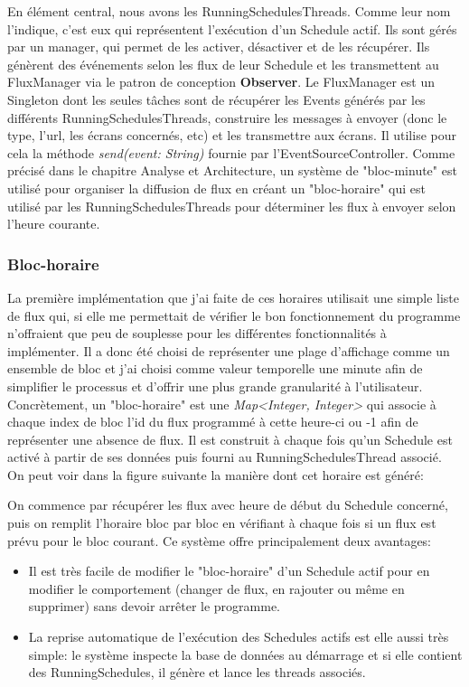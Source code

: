 \documentclass[french]{article}
\begin{document}
En élément central, nous avons les RunningSchedulesThreads. Comme leur nom l'indique, c'est eux qui représentent l'exécution d'un Schedule actif. Ils sont gérés par un manager, qui permet de les activer, désactiver et de les récupérer. Ils génèrent des événements selon les flux de leur Schedule et les transmettent au FluxManager via le patron de conception \textbf{Observer}. \newline
Le FluxManager est un Singleton dont les seules tâches sont de récupérer les Events générés par les différents RunningSchedulesThreads, construire les messages à envoyer (donc le type, l'url, les écrans concernés, etc) et les transmettre aux écrans. Il utilise pour cela la méthode \textit{send(event: String)} fournie par l'EventSourceController.\newline
Comme précisé dans le chapitre Analyse et Architecture, un système de "bloc-minute" est utilisé pour organiser la diffusion de flux en créant un "bloc-horaire" qui est utilisé par les RunningSchedulesThreads pour déterminer les flux à envoyer selon l'heure courante.

\subsubsection{Bloc-horaire}
La première implémentation que j'ai faite de ces horaires utilisait une simple liste de flux qui, si elle me permettait de vérifier le bon fonctionnement du programme n'offraient que peu de souplesse pour les différentes fonctionnalités à implémenter. Il a donc été choisi de représenter une plage d'affichage comme un ensemble de bloc et j'ai choisi comme valeur temporelle une minute afin de simplifier le processus et d'offrir une plus grande granularité à l'utilisateur.\newline
Concrètement, un "bloc-horaire" est une \textit{Map<Integer, Integer>} qui associe à chaque index de bloc l'id du flux programmé à cette heure-ci ou -1 afin de représenter une absence de flux. Il est construit à chaque fois qu'un Schedule est activé à partir de ses données puis fourni au RunningSchedulesThread associé. On peut voir dans la figure suivante la manière dont cet horaire est généré:



On commence par récupérer les flux avec heure de début du Schedule concerné, puis on remplit l'horaire bloc par bloc en vérifiant à chaque fois si un flux est prévu pour le bloc courant. \newline
Ce système offre principalement deux avantages: 
\begin{itemize}
	\item Il est très facile de modifier le "bloc-horaire" d'un Schedule actif pour en modifier le comportement (changer de flux, en rajouter ou même en supprimer) sans devoir arrêter le programme.
	\item La reprise automatique de l'exécution des Schedules actifs est elle aussi très simple: le système inspecte la base de données au démarrage et si elle contient des RunningSchedules, il génère et lance les threads associés.
\end{itemize}
\end{document}
